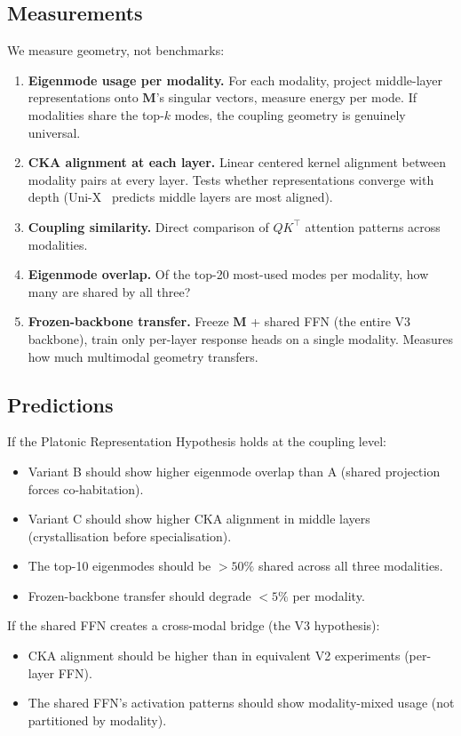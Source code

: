 \documentclass[11pt, a4paper]{article}
\newcommand{\M}{\mathbf{M}}
\theoremstyle{plain}
\theoremstyle{remark}
\begin{document}
\subsection{Measurements}

We measure geometry, not benchmarks:

\begin{enumerate}[nosep]
\item \textbf{Eigenmode usage per modality.} For each modality, project middle-layer representations onto $\M$'s singular vectors, measure energy per mode. If modalities share the top-$k$ modes, the coupling geometry is genuinely universal.
\item \textbf{CKA alignment at each layer.} Linear centered kernel alignment between modality pairs at every layer. Tests whether representations converge with depth (Uni-X~\cite{uni2025x} predicts middle layers are most aligned).
\item \textbf{Coupling similarity.} Direct comparison of $Q K^\top$ attention patterns across modalities.
\item \textbf{Eigenmode overlap.} Of the top-20 most-used modes per modality, how many are shared by all three?
\item \textbf{Frozen-backbone transfer.} Freeze $\M$ + shared FFN (the entire V3 backbone), train only per-layer response heads on a single modality. Measures how much multimodal geometry transfers.
\end{enumerate}

\subsection{Predictions}

If the Platonic Representation Hypothesis holds at the coupling level:
\begin{itemize}[nosep]
\item Variant B should show higher eigenmode overlap than A (shared projection forces co-habitation).
\item Variant C should show higher CKA alignment in middle layers (crystallisation before specialisation).
\item The top-10 eigenmodes should be $>50\%$ shared across all three modalities.
\item Frozen-backbone transfer should degrade $<5\%$ per modality.
\end{itemize}

If the shared FFN creates a cross-modal bridge (the V3 hypothesis):
\begin{itemize}[nosep]
\item CKA alignment should be higher than in equivalent V2 experiments (per-layer FFN).
\item The shared FFN's activation patterns should show modality-mixed usage (not partitioned by modality).
\end{itemize}
\end{document}

